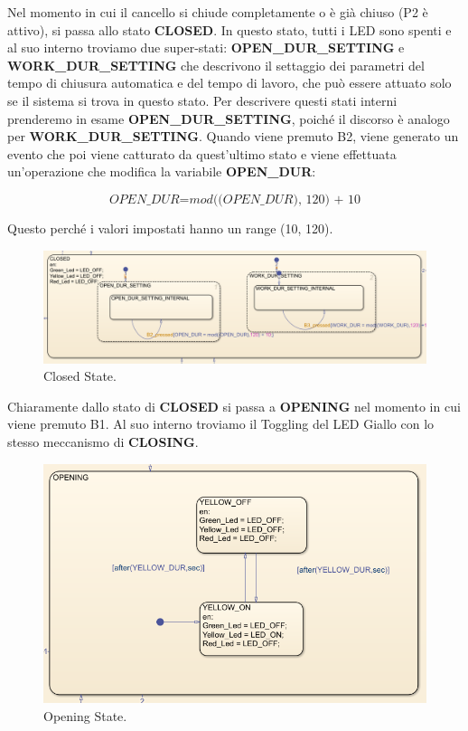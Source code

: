 \documentclass[12pt]{article}
\begin{document}
Nel momento in cui il cancello si chiude completamente o è già chiuso (P2 è attivo), si passa allo stato \textbf{CLOSED}. In questo stato, tutti i LED sono spenti e al suo interno troviamo due super-stati: \textbf{OPEN\_DUR\_SETTING} e \textbf{WORK\_DUR\_SETTING} che descrivono il settaggio dei parametri del tempo di chiusura automatica e del tempo di lavoro, che può essere attuato solo se il sistema si trova in questo stato. Per descrivere questi stati interni prenderemo in esame \textbf{OPEN\_DUR\_SETTING}, poiché il discorso è analogo per \textbf{WORK\_DUR\_SETTING}. Quando viene premuto B2, viene generato un evento che poi viene catturato da quest'ultimo stato e viene effettuata un'operazione che modifica la variabile \textbf{OPEN\_DUR}: 

\[
\textit{OPEN\_DUR} = \textit{mod((OPEN\_DUR), 120) + 10}
\]

Questo perché i valori impostati hanno un range (10, 120).

\begin{figure}[H]
    \centering
    \includegraphics[width=1\textwidth]{Immagini_State_Flow/Closed.png}
    \caption{Closed State.}
\end{figure}

Chiaramente dallo stato di \textbf{CLOSED} si passa a \textbf{OPENING} nel momento in cui viene premuto B1. Al suo interno troviamo il Toggling del LED Giallo con lo stesso meccanismo di \textbf{CLOSING}.

\begin{figure}[H]
    \centering
    \includegraphics[width=1\textwidth]{Immagini_State_Flow/Opening.png}
    \caption{Opening State.}
\end{figure}
\end{document}
